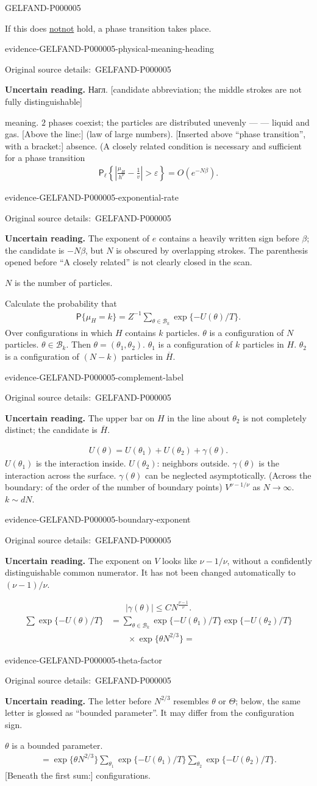 \documentclass[11pt]{article}
\let\MathUnderline\underline
\renewcommand{\underline}[1]{\ifmmode\MathUnderline{#1}\else\uline{#1}\fi}
\newcommand{\SourcePage}[2]{\par\smallskip\phantomsection\label{#1:source-page}{\small\sffamily\color{blue!55!black}#1}\par\smallskip}
\newcommand{\EvidenceBlock}[4]{%
 \par\smallskip\noindent\begin{minipage}{\linewidth}
 \begin{minipage}[t]{.47\linewidth}\vspace{0pt}\centering
 \csname evidence-#1-#2\endcsname\par
 {\scriptsize\SourceCropCaption\ #1}\par
 \end{minipage}\hfill
 \begin{minipage}[t]{.49\linewidth}\vspace{0pt}\raggedright
 {\small\color{orange!65!black}\textbf{#4} #3}\par
 \end{minipage}
 \end{minipage}\par\smallskip}
\newcommand{\Unclear}[3]{\EvidenceBlock{#1}{#2}{#3}{\ReadingCaption}}
\newcommand{\SourceCropCaption}{Original source details:}\newcommand{\ReadingCaption}{Uncertain reading.}\newcommand{\IncompleteCaption}{Undeciphered passage.}\newcommand{\DiagramCaption}{Diagram and typed description.}
\begin{document}
\SourcePage{GELFAND-P000005}{3}
If this does \underline{not} hold, a phase transition takes place.
\Unclear{GELFAND-P000005}{physical-meaning-heading}{Нагл. [candidate abbreviation; the middle strokes are not fully distinguishable]} meaning. $2$ phases coexist; the particles are distributed unevenly ---
--- liquid and gas.
[Above the line:] (law of large numbers).
[Inserted above ``phase transition'', with a bracket:] absence.
(A closely related condition is necessary and sufficient for a phase transition
\begin{gather*}
 \mathsf{P}_\ell\left\{\left|\frac{\mu_H}{h^\nu}-\frac1v\right|>\varepsilon\right\}
 =O(e^{-N\beta}).
\end{gather*}
\Unclear{GELFAND-P000005}{exponential-rate}{The exponent of $e$ contains a heavily written sign before $\beta$; the candidate is $-N\beta$, but $N$ is obscured by overlapping strokes. The parenthesis opened before ``A closely related'' is not clearly closed in the scan.}
[At right:] $N$ is the number of particles.

Calculate the probability that
\begin{gather*}
 \mathsf{P}\{\mu_H=k\}=Z^{-1}
 \sum_{\theta\in\mathcal{B}_k}\exp\{-U(\theta)/T\}.
\end{gather*}
Over configurations in which $H$ contains $k$ particles.
$\theta$ is a configuration of $N$ particles.
$\theta\in\mathcal{B}_k$.
Then $\theta=(\theta_1,\theta_2)$.
$\theta_1$ is a configuration of $k$ particles in $H$.
$\theta_2$ is a configuration of $(N-k)$ particles in $\overline H$.
\Unclear{GELFAND-P000005}{complement-label}{The upper bar on $H$ in the line about $\theta_2$ is not completely distinct; the candidate is $\overline H$.}
\begin{gather*}
 U(\theta)=U(\theta_1)+U(\theta_2)+\gamma(\theta).
\end{gather*}
$U(\theta_1)$ is the interaction inside.
$U(\theta_2)$: neighbors outside.
$\gamma(\theta)$ is the interaction across the surface.
$\gamma(\theta)$ can be neglected asymptotically.
(Across the boundary: of the order of the number of boundary points)
$V^{\nu-1/\nu}$ as $N\to\infty$.
$k\sim dN$.
\Unclear{GELFAND-P000005}{boundary-exponent}{The exponent on $V$ looks like $\nu-1/\nu$, without a confidently distinguishable common numerator. It has not been changed automatically to $(\nu-1)/\nu$.}
\begin{gather*}
 |\gamma(\theta)|\le CN^{\frac{\nu-1}{\nu}}.
\end{gather*}
\begin{align*}
 \sum\exp\{-U(\theta)/T\}
 &=\sum_{\theta\in\mathcal{B}_k}\exp\{-U(\theta_1)/T\}
 \exp\{-U(\theta_2)/T\}\\
 &\qquad\times
 \exp\{\theta N^{2/3}\}
 =
\end{align*}
\Unclear{GELFAND-P000005}{theta-factor}{The letter before $N^{2/3}$ resembles $\theta$ or $\Theta$; below, the same letter is glossed as ``bounded parameter''. It may differ from the configuration sign.}
$\theta$ is a bounded parameter.
\begin{gather*}
 =\exp\{\theta N^{2/3}\}
 \sum_{\theta_1}\exp\{-U(\theta_1)/T\}
 \sum_{\theta_2}\exp\{-U(\theta_2)/T\}.
\end{gather*}
[Beneath the first sum:] configurations.
\end{document}
